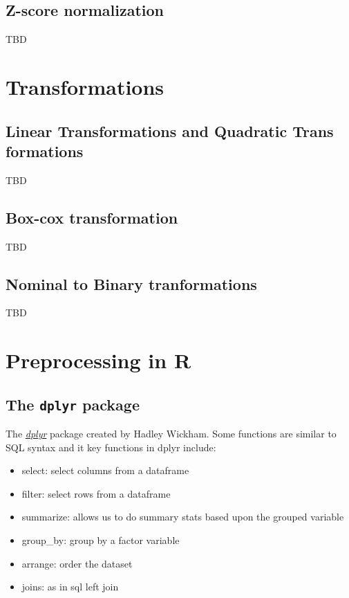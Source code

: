 \documentclass[]{book}
\providecommand{\tightlist}{%
  \setlength{\itemsep}{0pt}\setlength{\parskip}{0pt}}
\begin{document}
\subsection{Z-score normalization}\label{z-score-normalization}

TBD

\section{Transformations}\label{transformations}

\subsection{Linear Transformations and Quadratic Trans
formations}\label{linear-transformations-and-quadratic-trans-formations}

TBD

\subsection{Box-cox transformation}\label{box-cox-transformation}

TBD

\subsection{Nominal to Binary
tranformations}\label{nominal-to-binary-tranformations}

TBD

\section{Preprocessing in R}\label{preprocessing-in-r}

\subsection{\texorpdfstring{The \texttt{dplyr}
package}{The dplyr package}}\label{the-dplyr-package}

The
\emph{\href{https://cran.r-project.org/web/packages/dplyr/index.html}{dplyr}}
package created by Hadley Wickham. Some functions are similar to SQL
syntax and it key functions in dplyr include:

\begin{itemize}
\tightlist
\item
  select: select columns from a dataframe
\item
  filter: select rows from a dataframe
\item
  summarize: allows us to do summary stats based upon the grouped
  variable
\item
  group\_by: group by a factor variable
\item
  arrange: order the dataset
\item
  joins: as in sql left join
\end{itemize}
\end{document}
